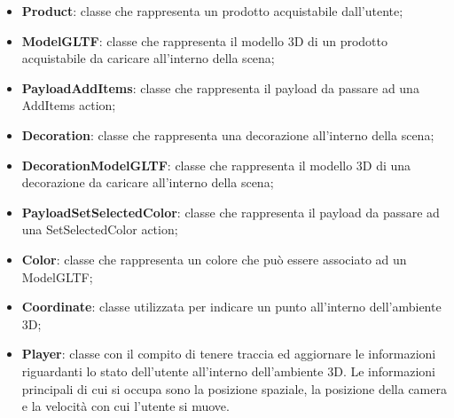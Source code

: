 \begin{itemize}
\begin{itemize}
			\item \textbf{Product}: classe che rappresenta un prodotto acquistabile dall'utente;
			\item \textbf{ModelGLTF}: classe che rappresenta il modello 3D di un prodotto acquistabile da caricare all'interno della scena;
			\item \textbf{PayloadAddItems}: classe che rappresenta il payload da passare ad una AddItems action;
			\item \textbf{Decoration}: classe che rappresenta una decorazione all'interno della scena;
			\item \textbf{DecorationModelGLTF}: classe che rappresenta il modello 3D di una decorazione da caricare all'interno della scena;
			\item \textbf{PayloadSetSelectedColor}: classe che rappresenta il payload da passare ad una SetSelectedColor action;
			\item \textbf{Color}: classe che rappresenta un colore che può essere associato ad un ModelGLTF; 
			\item \textbf{Coordinate}: classe utilizzata per indicare un punto all'interno dell'ambiente 3D;
			\item \textbf{Player}: classe con il compito di tenere traccia ed aggiornare le informazioni riguardanti 
			lo stato dell'utente all'interno dell'ambiente 3D.
			Le informazioni principali di cui si occupa sono la posizione spaziale, la posizione della camera e
			la velocità con cui l'utente si muove.
		\end{itemize}
		

\end{itemize}

